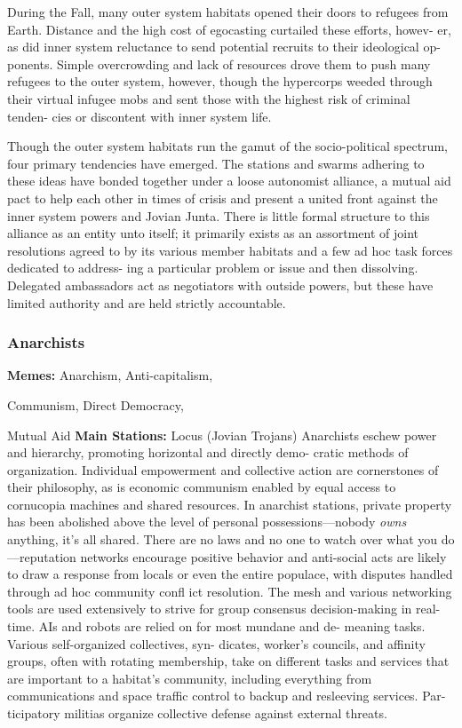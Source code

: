During the Fall, many outer system 
habitats opened their doors to refugees 
from Earth. Distance and the high cost of 
egocasting curtailed these efforts, howev-
er, as did inner system reluctance to send 
potential recruits to their ideological op-
ponents. Simple overcrowding and lack 
of resources drove them to push many 
refugees to the outer system, however, 
though the hypercorps weeded through 
their virtual infugee mobs and sent those 
with the highest risk of criminal tenden-
cies or discontent with inner system life.

Though the outer system habitats run 
the gamut of the socio-political spectrum, 
four primary tendencies have emerged. 
The stations and swarms adhering to these 
ideas have bonded together under a loose 
autonomist alliance, a mutual aid pact 
to help each other in times of crisis and 
present a united front against the inner 
system powers and Jovian Junta. There is 
little formal structure to this alliance as an 
entity unto itself; it primarily exists as an 
assortment of joint resolutions agreed to 
by its various member habitats and a few 
ad hoc task forces dedicated to address-
ing a particular problem or issue and then 
dissolving. Delegated ambassadors act 
as negotiators with outside powers, but 
these have limited authority and are held 
strictly accountable.

\subsubsection{Anarchists}

\textbf{Memes:} Anarchism, Anti-capitalism, 

Communism, Direct Democracy, 

Mutual Aid
\textbf{Main Stations:} Locus (Jovian Trojans)
Anarchists eschew power and hierarchy, 
promoting horizontal and directly demo-
cratic methods of organization. Individual 
empowerment and collective action are 
cornerstones of their philosophy, as is 
economic communism enabled by equal 
access to cornucopia machines and shared 
resources. In anarchist stations, private 
property has been abolished above the 
level of personal possessions—nobody 
\textit{owns} anything, it's all shared. There are 
no laws and no one to watch over what 
you do—reputation networks encourage 
positive behavior and anti-social acts are likely 
to draw a response from locals or even the entire 
populace, with disputes handled through ad hoc 
community confl ict resolution. The mesh and various 
networking tools are used extensively to strive for 
group consensus decision-making in real-time. AIs 
and robots are relied on for most mundane and de-
meaning tasks. Various self-organized collectives, syn-
dicates, worker's councils, and affinity groups, often 
with rotating membership, take on different tasks and 
services that are important to a habitat's community, 
including everything from communications and space 
traffic control to backup and resleeving services. Par-
ticipatory militias organize collective defense against 
external threats.


